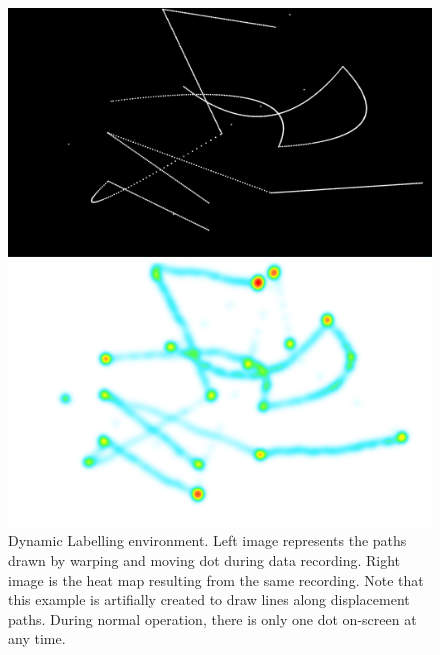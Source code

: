 \begin{figure}[h]
    \centering
    \begin{minipage}{0.5\textwidth}
        \centering
        \includegraphics[width=\textwidth]{Images/Labelling/DynamicEnvScreen.png} %
    \end{minipage}\hfill
    \begin{minipage}{0.5\textwidth}
        \centering
        \includegraphics[width=\textwidth]{Images/Labelling/DynamicEnvHm.png}%
    \end{minipage}
    \caption{Dynamic Labelling environment. Left image represents the paths drawn by warping and moving dot during data recording. Right image is the heat map resulting from the same recording. Note that this example is artifially created to draw lines along displacement paths. During normal operation, there is only one dot on-screen at any time.}
    \label{fig:meth_DynamicLabellingEnv}
\end{figure}
